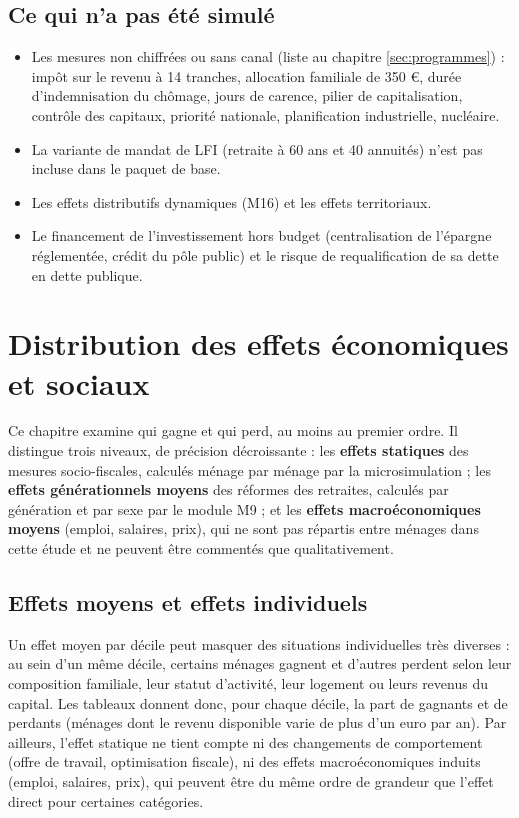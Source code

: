 \documentclass[
  11pt,
  11pt,
  a4paper,
  openany]{book}
\providecommand{\tightlist}{%
  \setlength{\itemsep}{0pt}\setlength{\parskip}{0pt}}
\begin{document}
\hypertarget{sec:non-simule}{%
\section{Ce qui n'a pas été simulé}\label{sec:non-simule}}

\begin{itemize}
\tightlist
\item
  Les mesures non chiffrées ou sans canal (liste au chapitre
  \ref{sec:programmes}) : impôt sur le revenu à 14 tranches, allocation
  familiale de 350 €, durée d'indemnisation du chômage, jours de
  carence, pilier de capitalisation, contrôle des capitaux, priorité
  nationale, planification industrielle, nucléaire.
\item
  La variante de mandat de LFI (retraite à 60 ans et 40 annuités) n'est
  pas incluse dans le paquet de base.
\item
  Les effets distributifs dynamiques (M16) et les effets territoriaux.
\item
  Le financement de l'investissement hors budget (centralisation de
  l'épargne réglementée, crédit du pôle public) et le risque de
  requalification de sa dette en dette publique.
\end{itemize}

\hypertarget{sec:distribution}{%
\chapter{Distribution des effets économiques et
sociaux}\label{sec:distribution}}

Ce chapitre examine qui gagne et qui perd, au moins au premier ordre. Il
distingue trois niveaux, de précision décroissante : les \textbf{effets
statiques} des mesures socio-fiscales, calculés ménage par ménage par la
microsimulation ; les \textbf{effets générationnels moyens} des réformes
des retraites, calculés par génération et par sexe par le module M9 ; et
les \textbf{effets macroéconomiques moyens} (emploi, salaires, prix),
qui ne sont pas répartis entre ménages dans cette étude et ne peuvent
être commentés que qualitativement.

\hypertarget{sec:moyens-individuels}{%
\section{Effets moyens et effets
individuels}\label{sec:moyens-individuels}}

Un effet moyen par décile peut masquer des situations individuelles très
diverses : au sein d'un même décile, certains ménages gagnent et
d'autres perdent selon leur composition familiale, leur statut
d'activité, leur logement ou leurs revenus du capital. Les tableaux
donnent donc, pour chaque décile, la part de gagnants et de perdants
(ménages dont le revenu disponible varie de plus d'un euro par an). Par
ailleurs, l'effet statique ne tient compte ni des changements de
comportement (offre de travail, optimisation fiscale), ni des effets
macroéconomiques induits (emploi, salaires, prix), qui peuvent être du
même ordre de grandeur que l'effet direct pour certaines catégories.
\end{document}
